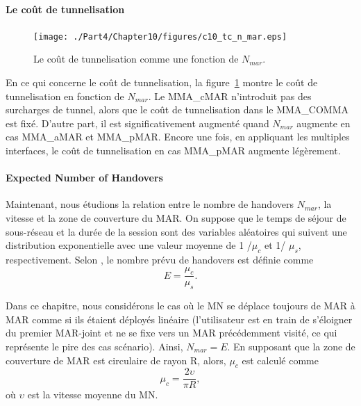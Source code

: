 \paragraph{Le coût de tunnelisation}
\begin{figure}[h!]
 	\begin{center} 
		\texttt{[image: ./Part4/Chapter10/figures/c10\_tc\_n\_mar.eps]}
		\caption[Le coût de tunnelisation.]{Le coût de tunnelisation comme une fonction de $N_{mar}$.}
		\label{fig:c10_tc_n_mar}
	\end{center}
\end{figure}

En ce qui concerne le coût de tunnelisation, la figure~\ref {fig:c10_tc_n_mar} montre le coût de tunnelisation en fonction de $ N_{mar} $. Le MMA\_cMAR n'introduit pas des surcharges de tunnel, alors que le coût de tunnelisation dans le MMA\_COMMA est fixé. D'autre part, il est significativement augmenté quand $ N_{mar} $ augmente en cas MMA\_aMAR et MMA\_pMAR. Encore une fois, en appliquant les multiples interfaces, le coût de tunnelisation en cas MMA\_pMAR augmente légèrement.

\paragraph{Expected Number of Handovers}
Maintenant, nous étudions la relation entre le nombre de handovers $ N_{mar} $, la vitesse et la zone de couverture du MAR. On suppose que le temps de séjour de sous-réseau et la durée de la session sont des variables aléatoires qui suivent une distribution exponentielle avec une valeur moyenne de 1 /$ \mu_{c} $ et 1/ $ \mu_{s} $, respectivement. Selon \cite{HO_comparison_Makaya}, le nombre prévu de handovers est définie comme \\

\begin{equation}
  E=\frac{\mu_{c}}{\mu_{s}}.
\end{equation}

Dans ce chapitre, nous considérons le cas où le MN se déplace toujours de MAR à MAR comme si ils étaient déployés linéaire (l'utilisateur est en train de s'éloigner du premier MAR-joint et ne se fixe vers un MAR précédemment visité, ce qui représente le pire des cas scénario). Ainsi, $ N_{mar} = E $. En supposant que la zone de couverture de MAR est circulaire de rayon R, alors, $ \mu_{c} $ est calculé comme \cite{HO_comparison_Makaya} \\

\begin{equation}
\mu_{c}=\frac{2 \upsilon}{\pi R},
\end{equation}
où $ \upsilon $ est la vitesse moyenne du MN.

